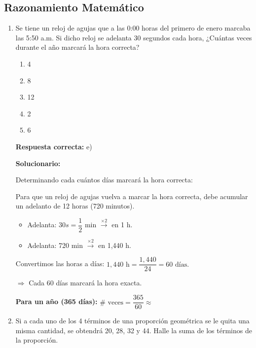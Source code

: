 \subsection*{Razonamiento Matemático}

\begin{enumerate}[resume]
	
	\item Se tiene un reloj de agujas que a las 0:00 horas del primero de enero marcaba las 5:50 a.m. Si dicho reloj se adelanta 30 segundos cada hora, ¿Cuántas veces durante el año marcará la hora correcta?
	
	\begin{enumerate}[label=\alph*)]
		\item 4
		\item 8 
		\item 12 
		\item 2
		\item 6
	\end{enumerate}
	
	\textbf{Respuesta correcta:} e)
	
	\vspace{2mm}
	\textbf{Solucionario:}
	
	Determinando cada cuántos días marcará la hora correcta:
	
	Para que un reloj de agujas vuelva a marcar la hora correcta, debe acumular un adelanto de 12 horas (720 minutos).
	
	\begin{itemize}
		\item Adelanta: $30s = \dfrac{1}{2}$ min $\xrightarrow{\times 2}$ en 1 h.
		\item Adelanta: 720 min $\xrightarrow{\times 2}$ en 1,440 h.
	\end{itemize}
	
	Convertimos las horas a días:
	$1,440 \text{ h} = \dfrac{1,440}{24} = 60 \text{ días.}$
	
	$\Rightarrow$ Cada 60 días marcará la hora exacta.
	
	\vspace{2mm}
	\textbf{Para un año (365 días):}
	$\# \text{ veces} = \dfrac{365}{60} \approx $
	
	\vspace{6mm}

	
	\item Si a cada uno de los 4 términos de una proporción geométrica se le quita una misma cantidad, se obtendrá 20, 28, 32 y 44. Halle la suma de los términos de la proporción.
	

\end{enumerate}
